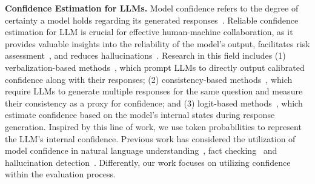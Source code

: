 \textbf{Confidence Estimation for LLMs.} 
Model confidence refers to the degree of certainty a model holds regarding its generated responses~\citep{gal2016uncertainty}. Reliable confidence estimation for LLM is crucial for effective human-machine collaboration, as it provides valuable insights into the reliability of the model’s output, facilitates risk assessment~\citep{geng2024survey}, and reduces hallucinations~\citep{varshney2023stitch}. Research in this field includes (1) verbalization-based methods~\citep{linteaching, yona2024can}, which prompt LLMs to directly output calibrated confidence along with their responses; (2) consistency-based methods~\citep{tian2023just, xiongcan}, which require LLMs to generate multiple responses for the same question and measure their consistency as a proxy for confidence; and (3) logit-based methods~\citep{duan2024shifting, malininuncertainty, kumar2024confidence}, which estimate confidence based on the model's internal states during response generation. Inspired by this line of work, we use token probabilities to represent the LLM's internal confidence. Previous work has considered the utilization of model confidence in natural language understanding~\citep{yangsupervised}, fact checking~\citep{geng2024multimodal} and hallucination detection~\citep{varshney2023stitch, farquhar2024detecting}. Differently, our work focuses on utilizing confidence within the evaluation process.


